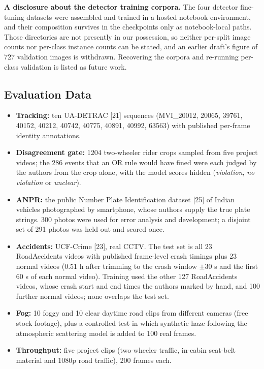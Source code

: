 \documentclass[10pt,a4paper,twocolumn]{article}
\begin{document}
\textbf{A disclosure about the detector training corpora.} The four detector fine-tuning datasets were assembled and
trained in a hosted notebook environment, and their composition survives in the checkpoints only as notebook-local
paths. Those directories are not presently in our possession, so neither per-split image counts nor per-class
instance counts can be stated, and an earlier draft's figure of 727 validation images is withdrawn. Recovering the
corpora and re-running per-class validation is listed as future work.

\subsection{Evaluation Data}
\begin{itemize}
\item \textbf{Tracking:} ten UA-DETRAC [21] sequences (MVI\_20012, 20065, 39761, 40152, 40212, 40742, 40775, 40891,
40992, 63563) with published per-frame identity annotations.
\item \textbf{Disagreement gate:} 1204 two-wheeler rider crops sampled from five project videos; the 286 events that
an OR rule would have fined were each judged by the authors from the crop alone, with the model scores hidden
(\emph{violation}, \emph{no violation} or \emph{unclear}).
\item \textbf{ANPR:} the public Number Plate Identification dataset [25] of Indian vehicles photographed by
smartphone, whose authors supply the true plate strings. 300 photos were used for error analysis and development; a
disjoint set of 291 photos was held out and scored once.
\item \textbf{Accidents:} UCF-Crime [23], real CCTV. The test set is all 23 RoadAccidents videos with published
frame-level crash timings plus 23 normal videos (0.51 h after trimming to the crash window $\pm$30 s and the first
60 s of each normal video). Training used the other 127 RoadAccidents videos, whose crash start and end times the
authors marked by hand, and 100 further normal videos; none overlaps the test set.
\item \textbf{Fog:} 10 foggy and 10 clear daytime road clips from different cameras (free stock footage), plus a
controlled test in which synthetic haze following the atmospheric scattering model is added to 100 real frames.
\item \textbf{Throughput:} five project clips (two-wheeler traffic, in-cabin seat-belt material and 1080p road
traffic), 200 frames each.
\end{itemize}
\end{document}

